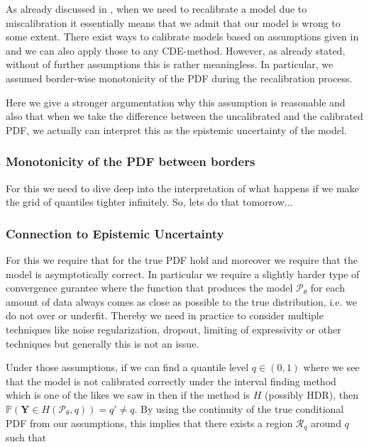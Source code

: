 As already discussed in , when we need to recalibrate a model due to miscalibration it essentially means that we admit that our model is wrong to some extent. There exist ways to calibrate models based on assumptions given in  and we can also apply those to any CDE-method. However, as already stated, without of further assumptions this is rather meaningless. In particular, we assumed border-wise monotonicity of the PDF during the recalibration process.

Here we give a stronger argumentation why this assumption is reasonable and also that when we take the difference between the uncalibrated and the calibrated PDF, we actually can interpret this as the epistemic uncertainty of the model.

\subsubsection{Monotonicity of the PDF between borders}

For this we need to dive deep into the interpretation of what happens if we make the grid of quantiles tighter infinitely. So, lets do that tomorrow... %

\subsubsection{Connection to Epistemic Uncertainty} 

For this we require that for the true PDF  hold and moreover we require that the model is asymptotically correct. In particular we require a slightly harder type of convergence gurantee where the function that produces the model $\mathcal{P}_{\theta}$ for each amount of data always comes as close as possible to the true distribution, i.e. we do not over or underfit. Thereby we need in practice to consider multiple techniques like noise regularization, dropout, limiting of expressivity or other techniques but generally this is not an issue.

Under those assumptions, if we can find a quantile level $q\in(0,1)$ where we see that the model is not calibrated correctly under the interval finding method which is one of the likes we saw in \pef{} then if the method is $H$ (possibly HDR), then $\mathbb{P}(\mathbf{Y} \in H(\mathcal{P}_\theta, q)) = q' \neq q$. By using the continuity of the true conditional PDF from our assumptions, this implies that there exists a region $\mathcal{R}_q$ around $q$ such that

